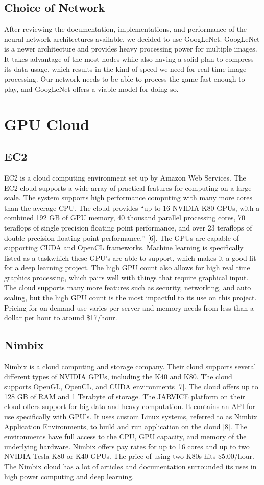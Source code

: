 \documentclass{scrreprt}
\begin{document}
\subsection{Choice of Network}
After reviewing the documentation, implementations, and performance of the neural network
architectures available, we decided to use GoogLeNet. GoogLeNet is a newer architecture and
provides heavy processing power for multiple images. It takes advantage of the most nodes while
also having a solid plan to compress its data usage, which results in the kind of speed we need
for real-time image processing. Our network needs to be able to process the game fast enough to
play, and GoogLeNet offers a viable model for doing so.

\section{GPU Cloud}
\subsection{EC2}
EC2 is a cloud computing environment set up by Amazon Web Services. The EC2 cloud
supports a wide array of practical features for computing on a large scale. The system supports
high performance computing with many more cores than the average CPU. The cloud provides
“up to 16 NVIDIA K80 GPUs, with a combined 192 GB of GPU memory, 40 thousand parallel
processing cores, 70 teraflops of single precision floating point performance, and over 23
teraflops of double precision floating point performance,” [6]. The GPUs are capable of
supporting CUDA and OpenCL frameworks. Machine learning is specifically listed as a taskwhich these GPU’s are able to support, which makes it a good fit for a deep learning project. The
high GPU count also allows for high real time graphics processing, which pairs well with things
that require graphical input. The cloud supports many more features such as security,
networking, and auto scaling, but the high GPU count is the most impactful to its use on this
project. Pricing for on demand use varies per server and memory needs from less than a dollar
per hour to around \$17/hour.

\subsection{Nimbix}
Nimbix is a cloud computing and storage company. Their cloud supports several different types
of NVIDIA GPUs, including the K40 and K80. The cloud supports OpenGL, OpenCL, and
CUDA environments [7]. The cloud offers up to 128 GB of RAM and 1 Terabyte of storage. The
JARVICE platform on their cloud offers support for big data and heavy computation. It contains
an API for use specifically with GPU’s. It uses custom Linux systems, referred to as Nimbix
Application Environments, to build and run application on the cloud [8]. The environments have
full access to the CPU, GPU capacity, and memory of the underlying hardware. Nimbix offers
pay rates for up to 16 cores and up to two NVIDIA Tesla K80 or K40 GPUs. The price of using
two K80s hits \$5.00/hour. The Nimbix cloud has a lot of articles and documentation surrounded
its uses in high power computing and deep learning.
\end{document}
